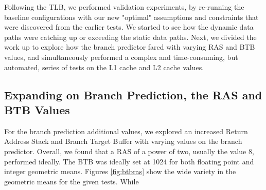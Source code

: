 \documentclass[paper=a4, fontsize=12pt]{scrartcl} %
\numberwithin{equation}{section} %
\numberwithin{figure}{section} %
\numberwithin{table}{section} %
\begin{document}
Following the TLB, we performed validation experiments, by re-running the baseline configurations with our new "optimal" assumptions and constraints that were discovered from the earlier tests. We started to see how the dynamic data paths were catching up or exceeding the static data paths. Next, we divided the work up to explore how the branch predictor fared with varying RAS and BTB values, and simultaneously performed a complex and time-consuming, but automated, series of tests on the L1 cache and L2 cache values.


\subsection{Expanding on Branch Prediction, the RAS and BTB Values}

For the branch prediction additional values, we explored an increased Return Address Stack and Branch Target Buffer with varying values on the branch predictor. Overall, we found that a RAS of a power of two, usually the value 8, performed ideally. The BTB was ideally set at 1024 for both floating point and integer geometric means. Figures \ref{fig:btbras} show the wide variety in the geometric means for the given tests. While 
\end{document}
